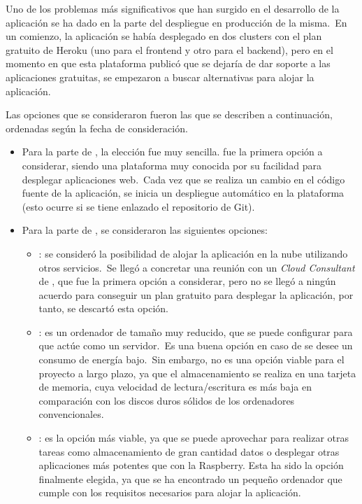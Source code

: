 Uno de los problemas más significativos que han surgido en el desarrollo de la aplicación se ha dado en la parte del
despliegue en producción de la misma.\ En un comienzo, la aplicación se había desplegado en dos clusters con el plan
gratuito de Heroku (uno para el frontend y otro para el backend), pero en el momento en que esta plataforma publicó
que se dejaría de dar soporte a las aplicaciones gratuitas, se empezaron a buscar alternativas para alojar la
aplicación.

Las opciones que se consideraron fueron las que se describen a continuación, ordenadas según la fecha de consideración.

\begin{itemize}
	\item Para la parte de , la elección fue muy sencilla.  fue la primera opción
	a considerar, siendo una plataforma muy conocida por su facilidad para desplegar aplicaciones web.\ Cada vez que se
	realiza un cambio en el código fuente de la aplicación, se inicia un despliegue automático en la plataforma (esto
	ocurre si se tiene enlazado el repositorio de Git).

	\item Para la parte de , se consideraron las siguientes opciones:
	\begin{itemize}
		\item {}: se consideró la posibilidad de alojar la aplicación en la nube utilizando otros
		servicios.\ Se llegó a concretar una reunión con un \textit{Cloud Consultant} de , que
		fue la primera opción a considerar, pero no se llegó a ningún acuerdo para conseguir un plan gratuito para
		desplegar la aplicación, por tanto, se descartó esta opción.

		\item {}: es un ordenador de tamaño muy reducido, que se puede configurar para que actúe como un
		servidor.\ Es una buena opción en caso de se desee un consumo de energía bajo.\ Sin embargo, no es una opción
		viable para el proyecto a largo plazo, ya que el almacenamiento se realiza en una tarjeta de memoria, cuya
		velocidad de lectura/escritura es más baja en comparación con los discos duros sólidos de los ordenadores
		convencionales.

		\item {}: es la opción más viable, ya que se puede aprovechar para realizar otras tareas como
		almacenamiento de gran cantidad datos o desplegar otras aplicaciones más potentes que con la Raspberry.
		Esta ha sido la opción finalmente elegida, ya que se ha encontrado un pequeño ordenador que cumple con los
		requisitos necesarios para alojar la aplicación.
	\end{itemize}
\end{itemize}

